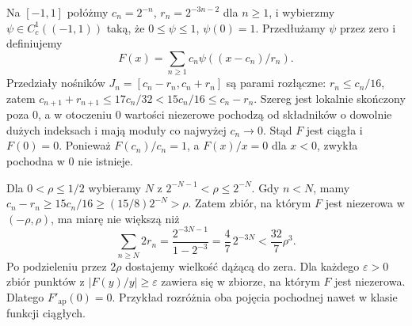 \begin{przyklad}
\label{it:ex:approx-not-ordinary}
Na $[-1,1]$ połóżmy $c_n=2^{-n}$, $r_n=2^{-3n-2}$
dla $n\ge1$, i wybierzmy $\psi\in C_c^1((-1,1))$
taką, że $0\le\psi\le1$, $\psi(0)=1$.
Przedłużamy $\psi$ przez zero i definiujemy
\[
 F(x)=\sum_{n\ge1}c_n\psi((x-c_n)/r_n).
\]
Przedziały nośników $J_n=[c_n-r_n,c_n+r_n]$
są parami rozłączne: $r_n\le c_n/16$, zatem
$c_{n+1}+r_{n+1}\le17c_n/32<15c_n/16\le c_n-r_n$.
Szereg jest lokalnie skończony poza $0$, a w otoczeniu
$0$ wartości niezerowe pochodzą od składników o
dowolnie dużych indeksach i mają moduły co najwyżej
$c_n\to0$. Stąd $F$ jest ciągła i $F(0)=0$.
Ponieważ $F(c_n)/c_n=1$, a $F(x)/x=0$ dla $x<0$,
zwykła pochodna w $0$ nie istnieje.

Dla $0<\rho\le1/2$ wybieramy $N$ z
$2^{-N-1}<\rho\le2^{-N}$. Gdy $n<N$, mamy
$c_n-r_n\ge15c_n/16\ge(15/8)2^{-N}>\rho$.
Zatem zbiór, na którym $F$ jest niezerowa w
$(-\rho,\rho)$, ma miarę nie większą niż
\[
 \sum_{n\ge N}2r_n
 =\frac{2^{-3N-1}}{1-2^{-3}}=\frac47\,2^{-3N}
 <\frac{32}{7}\rho^3.
\]
Po podzieleniu przez $2\rho$ dostajemy wielkość
dążącą do zera. Dla każdego $\varepsilon>0$ zbiór
punktów z $|F(y)/y|\ge\varepsilon$ zawiera się
w zbiorze, na którym $F$ jest niezerowa. Dlatego
$F'_{\mathrm{ap}}(0)=0$. Przykład rozróżnia oba
pojęcia pochodnej nawet w klasie funkcji ciągłych.
\end{przyklad}

